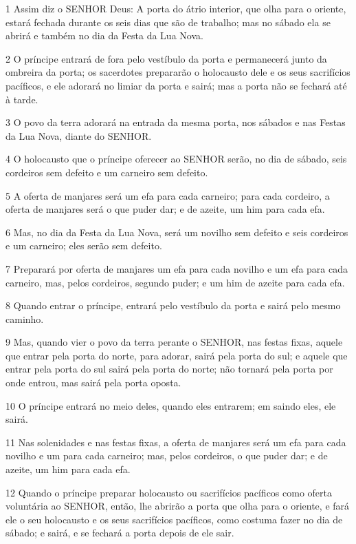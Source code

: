 \par 1 Assim diz o SENHOR Deus: A porta do átrio interior, que olha para o oriente, estará fechada durante os seis dias que são de trabalho; mas no sábado ela se abrirá e também no dia da Festa da Lua Nova.
\par 2 O príncipe entrará de fora pelo vestíbulo da porta e permanecerá junto da ombreira da porta; os sacerdotes prepararão o holocausto dele e os seus sacrifícios pacíficos, e ele adorará no limiar da porta e sairá; mas a porta não se fechará até à tarde.
\par 3 O povo da terra adorará na entrada da mesma porta, nos sábados e nas Festas da Lua Nova, diante do SENHOR.
\par 4 O holocausto que o príncipe oferecer ao SENHOR serão, no dia de sábado, seis cordeiros sem defeito e um carneiro sem defeito.
\par 5 A oferta de manjares será um efa para cada carneiro; para cada cordeiro, a oferta de manjares será o que puder dar; e de azeite, um him para cada efa.
\par 6 Mas, no dia da Festa da Lua Nova, será um novilho sem defeito e seis cordeiros e um carneiro; eles serão sem defeito.
\par 7 Preparará por oferta de manjares um efa para cada novilho e um efa para cada carneiro, mas, pelos cordeiros, segundo puder; e um him de azeite para cada efa.
\par 8 Quando entrar o príncipe, entrará pelo vestíbulo da porta e sairá pelo mesmo caminho.
\par 9 Mas, quando vier o povo da terra perante o SENHOR, nas festas fixas, aquele que entrar pela porta do norte, para adorar, sairá pela porta do sul; e aquele que entrar pela porta do sul sairá pela porta do norte; não tornará pela porta por onde entrou, mas sairá pela porta oposta.
\par 10 O príncipe entrará no meio deles, quando eles entrarem; em saindo eles, ele sairá.
\par 11 Nas solenidades e nas festas fixas, a oferta de manjares será um efa para cada novilho e um para cada carneiro; mas, pelos cordeiros, o que puder dar; e de azeite, um him para cada efa.
\par 12 Quando o príncipe preparar holocausto ou sacrifícios pacíficos como oferta voluntária ao SENHOR, então, lhe abrirão a porta que olha para o oriente, e fará ele o seu holocausto e os seus sacrifícios pacíficos, como costuma fazer no dia de sábado; e sairá, e se fechará a porta depois de ele sair.
